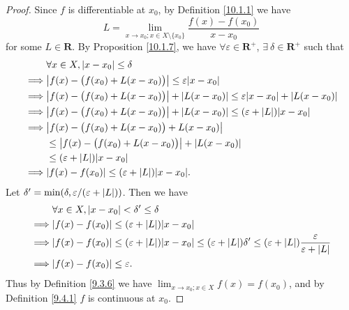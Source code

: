 \begin{proof}
    Since \(f\) is differentiable at \(x_0\), by Definition \ref{10.1.1} we have
    \[
        L = \lim_{x \to x_0 ; x \in X \setminus \{x_0\}} \frac{f(x) - f(x_0)}{x - x_0}
    \]
    for some \(L \in \mathbf{R}\).
    By Proposition \ref{10.1.7}, we have \(\forall \varepsilon \in \mathbf{R}^+\), \(\exists\ \delta \in \mathbf{R}^+\) such that
    \begin{align*}
                 & \forall x \in X, \abs*{x - x_0} \leq \delta                                                                         \\
        \implies & \abs*{f(x) - \big(f(x_0) + L(x - x_0)\big)} \leq \varepsilon \abs*{x - x_0}                                         \\
        \implies & \abs*{f(x) - \big(f(x_0) + L(x - x_0)\big)} + \abs*{L(x - x_0)} \leq \varepsilon \abs*{x - x_0} + \abs*{L(x - x_0)} \\
        \implies & \abs*{f(x) - \big(f(x_0) + L(x - x_0)\big)} + \abs*{L(x - x_0)} \leq (\varepsilon + \abs*{L}) \abs*{x - x_0}        \\
        \implies & \abs*{f(x) - \big(f(x_0) + L(x - x_0)\big) + L(x - x_0)}                                                            \\
                 & \leq \abs*{f(x) - \big(f(x_0) + L(x - x_0)\big)} + \abs*{L(x - x_0)}                                                \\
                 & \leq (\varepsilon + \abs*{L}) \abs*{x - x_0}                                                                        \\
        \implies & \abs*{f(x) - f(x_0)} \leq (\varepsilon + \abs*{L}) \abs*{x - x_0}.
    \end{align*}
    Let \(\delta' = \min(\delta, \varepsilon / (\varepsilon + \abs*{L}))\).
    Then we have
    \begin{align*}
                 & \forall x \in X, \abs*{x - x_0} < \delta' \leq \delta                                                                                                                            \\
        \implies & \abs*{f(x) - f(x_0)} \leq (\varepsilon + \abs*{L}) \abs*{x - x_0}                                                                                                                \\
        \implies & \abs*{f(x) - f(x_0)} \leq (\varepsilon + \abs*{L}) \abs*{x - x_0} \leq (\varepsilon + \abs*{L}) \delta' \leq (\varepsilon + \abs*{L}) \frac{\varepsilon}{\varepsilon + \abs*{L}} \\
        \implies & \abs*{f(x) - f(x_0)} \leq \varepsilon.
    \end{align*}
    Thus by Definition \ref{9.3.6} we have \(\lim_{x \to x_0 ; x \in X} f(x) = f(x_0)\), and by Definition \ref{9.4.1} \(f\) is continuous at \(x_0\).
\end{proof}

